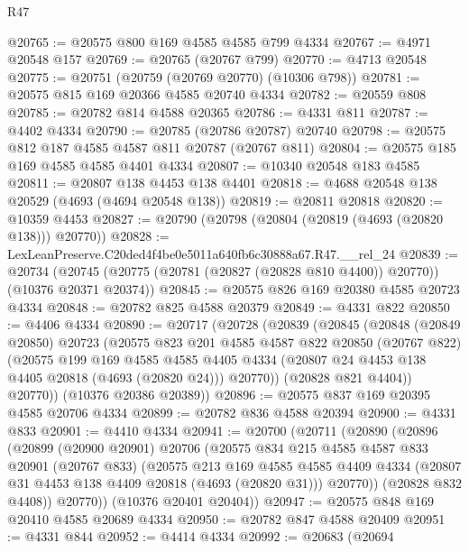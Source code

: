 \begin{lexlean}{R47}
\begin{coremodule}
@20765 := @20575 @800 @169 @4585 @4585 @799 @4334
@20767 := @4971 @20548 @157
@20769 := @20765 (@20767 @799)
@20770 := @4713 @20548
@20775 := @20751 (@20759 (@20769 @20770) (@10306 @798))
@20781 := @20575 @815 @169 @20366 @4585 @20740 @4334
@20782 := @20559 @808
@20785 := @20782 @814 @4588 @20365
@20786 := @4331 @811
@20787 := @4402 @4334
@20790 := @20785 (@20786 @20787) @20740
@20798 := @20575 @812 @187 @4585 @4587 @811 @20787 (@20767 @811)
@20804 := @20575 @185 @169 @4585 @4585 @4401 @4334
@20807 := @10340 @20548 @183 @4585
@20811 := @20807 @138 @4453 @138 @4401
@20818 := @4688 @20548 @138 @20529 (@4693 (@4694 @20548 @138))
@20819 := @20811 @20818
@20820 := @10359 @4453
@20827 := @20790 (@20798 (@20804 (@20819 (@4693 (@20820 @138))) @20770))
@20828 := LexLeanPreserve.C20ded4f4be0e5011a640fb6c30888a67.R47.__rel_24
@20839 := @20734
    (@20745 (@20775 (@20781 (@20827 (@20828 @810 @4400)) @20770)) (@10376 @20371 @20374))
@20845 := @20575 @826 @169 @20380 @4585 @20723 @4334
@20848 := @20782 @825 @4588 @20379
@20849 := @4331 @822
@20850 := @4406 @4334
@20890 := @20717
    (@20728
      (@20839
        (@20845
          (@20848
            (@20849 @20850)
            @20723
            (@20575
              @823
              @201
              @4585
              @4587
              @822
              @20850
              (@20767 @822)
              (@20575
                @199
                @169
                @4585
                @4585
                @4405
                @4334
                (@20807 @24 @4453 @138 @4405 @20818 (@4693 (@20820 @24)))
                @20770))
            (@20828 @821 @4404))
          @20770))
      (@10376 @20386 @20389))
@20896 := @20575 @837 @169 @20395 @4585 @20706 @4334
@20899 := @20782 @836 @4588 @20394
@20900 := @4331 @833
@20901 := @4410 @4334
@20941 := @20700
    (@20711
      (@20890
        (@20896
          (@20899
            (@20900 @20901)
            @20706
            (@20575
              @834
              @215
              @4585
              @4587
              @833
              @20901
              (@20767 @833)
              (@20575
                @213
                @169
                @4585
                @4585
                @4409
                @4334
                (@20807 @31 @4453 @138 @4409 @20818 (@4693 (@20820 @31)))
                @20770))
            (@20828 @832 @4408))
          @20770))
      (@10376 @20401 @20404))
@20947 := @20575 @848 @169 @20410 @4585 @20689 @4334
@20950 := @20782 @847 @4588 @20409
@20951 := @4331 @844
@20952 := @4414 @4334
@20992 := @20683
    (@20694

\end{coremodule}
\end{lexlean}
